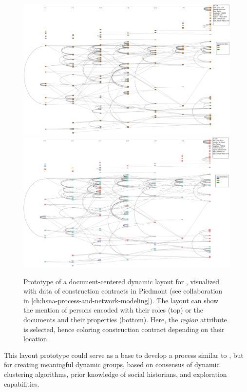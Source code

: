 \begin{figure}
    \centering
    \includegraphics[width=\textwidth]{static/figures/conclusion/dyn2}
    \includegraphics[width=\textwidth]{static/figures/conclusion/dyn2_region}
    \caption{Prototype of a document-centered dynamic layout for \modelplural, visualized with data of construction contracts in Piedmont (see collaboration \pascal in \autoref{ch:hsna-process-and-network-modeling}). The layout can show the mention of persons encoded with their roles (top) or the documents and their properties (bottom). Here, the \emph{region} attribute is selected, hence coloring construction contract depending on their location.}
\label{fig:conclu-dynLayout}
\end{figure}

This layout prototype could serve as a base to develop a process similar to \pkclustering, but for creating meaningful dynamic groups, based on consensus of dynamic clustering algorithms, prior knowledge of social historians, and exploration capabilities.



